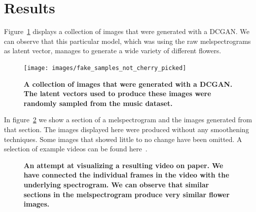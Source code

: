     \section{Results}

        Figure~\ref{fig:dcgan_samples} displays a collection of images that were generated with a DCGAN. We can observe that this particular model, which was using the raw melspectrograms as latent vector, manages to generate a wide variety of different flowers.

        \begin{figure}[ht]
            \centering
            \texttt{[image: images/fake\_samples\_not\_cherry\_picked]}
            \caption[not used]
            {
                \textbf{A collection of images that were generated with a DCGAN. The latent vectors used to produce these images were randomly sampled from the music dataset.}
            }
            \label{fig:dcgan_samples}
        \end{figure}

        In figure~\ref{fig:video} we show a section of a melspectrogram and the images generated from that section. The images displayed here were produced without any smoothening techniques. Some images that showed little to no change have been omitted. A selection of example videos can be found here~\cite{examples}.

        \begin{figure}[ht!]
            \centering
            \caption[not used]
            {
                \textbf{An attempt at visualizing a resulting video on paper. We have connected the individual frames in the video with the underlying spectrogram. We can observe that similar sections in the melspectrogram produce very similar flower images.}
            }
            \label{fig:video}
        \end{figure}

